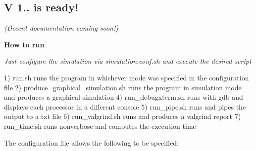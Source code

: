 \begin{center}\section*{{\bfseries V 1.. is ready!}}\end{center} 

\begin{center} {\itshape (Decent documentation coming soon!)}\end{center}  



\begin{center}{\bfseries How to run}\end{center} 

{\itshape Just configure the simulation via {\ttfamily simulation.\+conf.\+sh} and execute the desired script}

1) {\ttfamily run.\+sh} runs the program in whichever mode was specified in the configuration file 2) {\ttfamily produce\+\_\+graphical\+\_\+simulation.\+sh} runs the program in simulation mode and produces a graphical simulation 4) {\ttfamily run\+\_\+debugxterm.\+sh} runs with gdb and displays each processor in a different console 5) {\ttfamily run\+\_\+pipe.\+sh} runs and pipes the output to a txt file 6) {\ttfamily run\+\_\+valgrind.\+sh} runs and produces a valgrind report 7) {\ttfamily run\+\_\+time.\+sh} runs nonverbose and computes the execution time

The configuration file allows the following to be specified\+:


